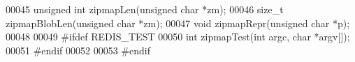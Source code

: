 \begin{DoxyCode}
00045 \textcolor{keywordtype}{unsigned} \textcolor{keywordtype}{int} zipmapLen(\textcolor{keywordtype}{unsigned} \textcolor{keywordtype}{char} *zm);
00046 size\_t zipmapBlobLen(\textcolor{keywordtype}{unsigned} \textcolor{keywordtype}{char} *zm);
00047 \textcolor{keywordtype}{void} zipmapRepr(\textcolor{keywordtype}{unsigned} \textcolor{keywordtype}{char} *p);
00048 
00049 \textcolor{preprocessor}{#}\textcolor{preprocessor}{ifdef} \textcolor{preprocessor}{REDIS\_TEST}
00050 \textcolor{keywordtype}{int} zipmapTest(\textcolor{keywordtype}{int} argc, \textcolor{keywordtype}{char} *argv[]);
00051 \textcolor{preprocessor}{#}\textcolor{preprocessor}{endif}
00052 
00053 \textcolor{preprocessor}{#}\textcolor{preprocessor}{endif}
\end{DoxyCode}
